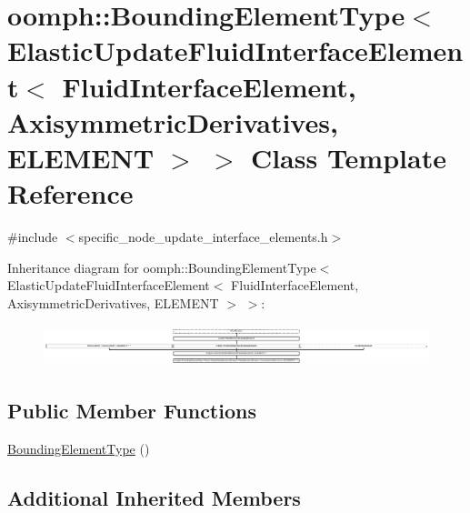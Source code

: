 \hypertarget{classoomph_1_1BoundingElementType_3_01ElasticUpdateFluidInterfaceElement_3_01FluidInterfaceEleme3184fbb3565ba21902c1c3c09e7b1c72}{}\section{oomph\+:\+:Bounding\+Element\+Type$<$ Elastic\+Update\+Fluid\+Interface\+Element$<$ Fluid\+Interface\+Element, Axisymmetric\+Derivatives, E\+L\+E\+M\+E\+NT $>$ $>$ Class Template Reference}
\label{classoomph_1_1BoundingElementType_3_01ElasticUpdateFluidInterfaceElement_3_01FluidInterfaceEleme3184fbb3565ba21902c1c3c09e7b1c72}


{\ttfamily \#include $<$specific\+\_\+node\+\_\+update\+\_\+interface\+\_\+elements.\+h$>$}

Inheritance diagram for oomph\+:\+:Bounding\+Element\+Type$<$ Elastic\+Update\+Fluid\+Interface\+Element$<$ Fluid\+Interface\+Element, Axisymmetric\+Derivatives, E\+L\+E\+M\+E\+NT $>$ $>$\+:\begin{figure}[H]
\begin{center}
\leavevmode
\includegraphics[height=1.212121cm]{classoomph_1_1BoundingElementType_3_01ElasticUpdateFluidInterfaceElement_3_01FluidInterfaceEleme3184fbb3565ba21902c1c3c09e7b1c72}
\end{center}
\end{figure}
\subsection*{Public Member Functions}
\begin{DoxyCompactItemize}
\item 
\hyperlink{classoomph_1_1BoundingElementType_3_01ElasticUpdateFluidInterfaceElement_3_01FluidInterfaceEleme3184fbb3565ba21902c1c3c09e7b1c72_af8a39d59170abd06b1504fcc1c4d84e8}{Bounding\+Element\+Type} ()
\end{DoxyCompactItemize}
\subsection*{Additional Inherited Members}


